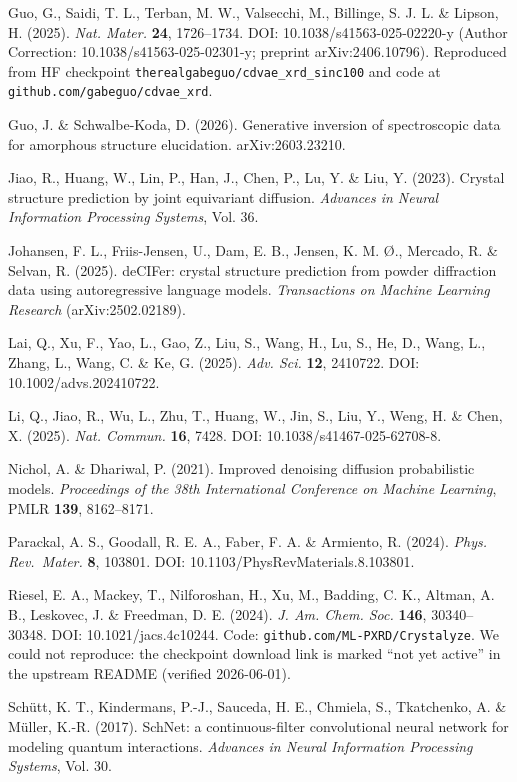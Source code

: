 \documentclass[
  11pt,
]{article}
\begin{document}
Guo, G., Saidi, T. L., Terban, M. W., Valsecchi, M., Billinge, S. J. L.
\& Lipson, H. (2025). \emph{Nat. Mater.} \textbf{24}, 1726--1734. DOI:
10.1038/s41563-025-02220-y (Author Correction:
10.1038/s41563-025-02301-y; preprint arXiv:2406.10796). Reproduced from
HF checkpoint \texttt{therealgabeguo/cdvae\_xrd\_sinc100} and code at
\texttt{github.com/gabeguo/cdvae\_xrd}.

Guo, J. \& Schwalbe-Koda, D. (2026). Generative inversion of
spectroscopic data for amorphous structure elucidation.
arXiv:2603.23210.

Jiao, R., Huang, W., Lin, P., Han, J., Chen, P., Lu, Y. \& Liu, Y.
(2023). Crystal structure prediction by joint equivariant diffusion.
\emph{Advances in Neural Information Processing Systems}, Vol. 36.

Johansen, F. L., Friis-Jensen, U., Dam, E. B., Jensen, K. M. Ø.,
Mercado, R. \& Selvan, R. (2025). deCIFer: crystal structure prediction
from powder diffraction data using autoregressive language models.
\emph{Transactions on Machine Learning Research} (arXiv:2502.02189).

Lai, Q., Xu, F., Yao, L., Gao, Z., Liu, S., Wang, H., Lu, S., He, D.,
Wang, L., Zhang, L., Wang, C. \& Ke, G. (2025). \emph{Adv. Sci.}
\textbf{12}, 2410722. DOI: 10.1002/advs.202410722.

Li, Q., Jiao, R., Wu, L., Zhu, T., Huang, W., Jin, S., Liu, Y., Weng, H.
\& Chen, X. (2025). \emph{Nat. Commun.} \textbf{16}, 7428. DOI:
10.1038/s41467-025-62708-8.

Nichol, A. \& Dhariwal, P. (2021). Improved denoising diffusion
probabilistic models. \emph{Proceedings of the 38th International
Conference on Machine Learning}, PMLR \textbf{139}, 8162--8171.

Parackal, A. S., Goodall, R. E. A., Faber, F. A. \& Armiento, R. (2024).
\emph{Phys. Rev.~Mater.} \textbf{8}, 103801. DOI:
10.1103/PhysRevMaterials.8.103801.

Riesel, E. A., Mackey, T., Nilforoshan, H., Xu, M., Badding, C. K.,
Altman, A. B., Leskovec, J. \& Freedman, D. E. (2024). \emph{J. Am.
Chem. Soc.} \textbf{146}, 30340--30348. DOI: 10.1021/jacs.4c10244. Code:
\texttt{github.com/ML-PXRD/Crystalyze}. We could not reproduce: the
checkpoint download link is marked ``not yet active'' in the upstream
README (verified 2026-06-01).

Schütt, K. T., Kindermans, P.-J., Sauceda, H. E., Chmiela, S.,
Tkatchenko, A. \& Müller, K.-R. (2017). SchNet: a continuous-filter
convolutional neural network for modeling quantum interactions.
\emph{Advances in Neural Information Processing Systems}, Vol. 30.
\end{document}
